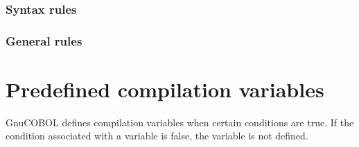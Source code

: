 \subsubsection{Syntax rules}

\subsubsection{General rules}

\section{Predefined compilation variables}

GnuCOBOL defines compilation variables when certain conditions are true. If the condition associated with a variable is false, the variable is not defined.

